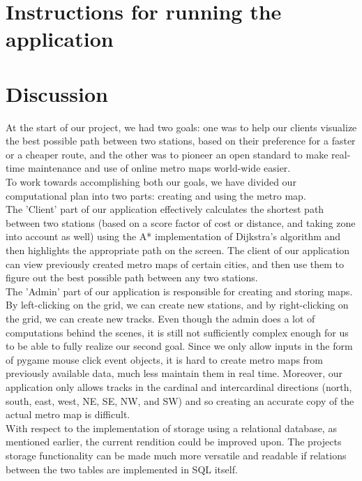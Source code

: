 \documentclass[fontsize=11pt]{article}
\begin{document}
    \section*{Instructions for running the application}
    \section*{Discussion}
    At the start of our project, we had two goals: one was to help our clients visualize the best possible path between two stations, based on their preference for a faster or a cheaper route, and the other was to pioneer an open standard to make real-time maintenance and use of online metro maps world-wide easier. \\

To work towards accomplishing both our goals, we have divided our computational plan into two parts: creating and using the metro map. \\

The 'Client' part of our application effectively calculates the shortest path between two stations (based on a score factor of cost or distance, and taking zone into account as well) using the A* implementation of Dijkstra's algorithm and then highlights the appropriate path on the screen. The client of our application can view previously created metro maps of certain cities, and then use them to figure out the best possible path between any two stations.\\

The 'Admin' part of our application is responsible for creating and storing maps. By left-clicking on the grid, we can create new stations, and by right-clicking on the grid, we can create new tracks. Even though the admin does a lot of computations behind the scenes, it is still not sufficiently complex enough for us to be able to fully realize our second goal. Since we only allow inputs in the form of pygame mouse click event objects, it is hard to create metro maps from previously available data, much less maintain them in real time. Moreover, our application only allows tracks in the cardinal and intercardinal directions (north, south, east, west, NE, SE, NW, and SW) and so creating an accurate copy of the actual metro map is difficult. \\

With  respect to the implementation of storage using a relational database, as mentioned earlier, the current rendition could be improved upon. The projects storage functionality can be made much more versatile and readable if relations between the two tables are implemented in SQL itself. \\
\end{document}
